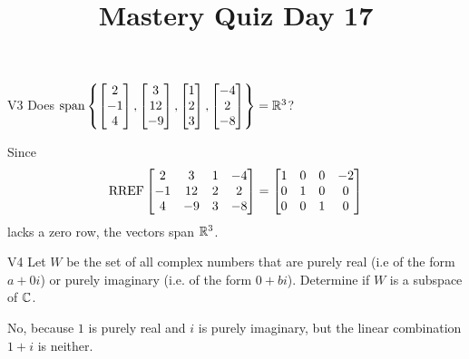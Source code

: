 \documentclass{sbgLAquiz}
\title{Mastery Quiz Day 17 }
\begin{document}
\begin{problem}{V3}
Does
\(
  \operatorname{span}\left\{
    \begin{bmatrix} 2 \\ -1 \\ 4 \end{bmatrix},
    \begin{bmatrix} 3 \\ 12 \\ -9 \end{bmatrix},
    \begin{bmatrix} 1 \\ 2 \\ 3 \end{bmatrix},
    \begin{bmatrix} -4 \\ 2 \\ -8 \end{bmatrix}
  \right\} = \mathbb{R}^3
\)?
\end{problem}
\begin{solution}
Since
\[
  \operatorname{RREF}\begin{bmatrix}
    2 & 3 & 1 & -4 \\
    -1 & 12 & 2 & 2 \\
    4 & -9 & 3 & -8
  \end{bmatrix} =
  \begin{bmatrix}
    1 & 0 & 0 & -2 \\
    0 & 1 & 0 & 0 \\
    0 & 0 & 1 & 0
  \end{bmatrix}
\]
lacks a zero row, the vectors span \(\mathbb{R}^3\).
\end{solution}

\begin{problem}{V4} Let \(W\) be the set of all complex numbers
that are purely real (i.e of the form $a+0i$)  or purely imaginary (i.e. of the form $0+bi$).
Determine if \(W\) is a subspace of \(\mathbb{C}\).
\end{problem}
\begin{solution}
No, because \(1\) is purely real and \(i\) is purely imaginary, but
the linear combination \(1+i\) is neither.
\end{solution}
\end{document}

